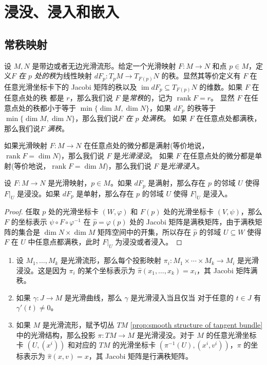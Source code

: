 \documentclass[fontset=none]{Notes}
\DeclareMathOperator\im{im}
\DeclareMathOperator\rk{rank}
\begin{document}
\chapter{浸没、浸入和嵌入}

\section{常秩映射}

设 $M,N$ 是带边或者无边光滑流形。给定一个光滑映射 $F:M\to N$
和点 $p\in M$，定义\emph{$F$ 在 $p$ 处的秩}为线性映射 $dF_p:T_pM\to T_{F(p)}N$
的秩。显然其等价定义有 $F$ 在任意光滑坐标卡下的 Jacobi 矩阵的秩以及
$\im dF_p\subseteq T_{F(p)}N$ 的维数。如果 $F$ 在任意点处的秩
都是 $r$，那么我们说 $F$ 是\emph{常秩}的，记为 $\rk F=r$。
显然 $F$ 在任意点处的秩都小于等于 $\min\{\dim M,\dim N\}$，如果
$dF_p$ 的秩等于 $\min\{\dim M,\dim N\}$，那么我们说\emph{$F$ 在 $p$ 处满秩}。
如果 $F$ 在任意点处都满秩，那么我们说\emph{$F$ 满秩}。

如果光滑映射 $F:M\to N$ 在任意点处的微分都是满射(等价地说，$\rk F=\dim N$)，那么我们说 $F$ 是\emph{光滑浸没}。
如果 $F$ 在任意点处的微分都是单射(等价地说，$\rk F=\dim M$)，那么我们说 $F$ 是\emph{光滑浸入}。

\begin{proposition}\label{prop:regular points is open}
  设 $F:M\to N$ 是光滑映射，$p\in M$。如果 $dF_p$ 是满射，那么存在 $p$ 
  的邻域 $U$ 使得 $F|_U$ 是浸没。如果 $dF_p$ 是单射，那么存在 $p$ 
  的邻域 $U$ 使得 $F|_U$ 是浸入。
\end{proposition}
\begin{proof}
  任取 $p$ 处的光滑坐标卡 $(W,\varphi)$ 和 $F(p)$ 处的光滑坐标卡 $(V,\psi)$，那么 $F$
  的坐标表示 $\psi\circ F\circ\varphi^{-1}$ 在 $\hat p=\varphi(p)$ 处的 Jacobi 矩阵是满秩矩阵，由于满秩矩阵的集合是 $\dim N\times\dim M$
  矩阵空间中的开集，所以存在 $\hat p$ 的邻域 $U\subseteq W$ 使得 $F$ 
  在 $U$ 中任意点都满秩，此时 $F|_U$ 为浸没或者浸入。
\end{proof}

\begin{example}[浸没和浸入]
  \mbox{}
  \begin{enumerate}
    \item 设 $M_1,\dots,M_k$ 是光滑流形，那么每个投影映射 $\pi_i:M_1\times\cdots\times M_k\to M_i$
    是光滑浸没。这是因为 $\pi_i$ 的某个坐标表示为
    $\hat \pi(x_1,\dots,x_k)=x_i$，其 Jacobi 矩阵满秩。
    \item 如果 $\gamma:J\to M$ 是光滑曲线，那么 $\gamma$ 是光滑浸入当且仅当
    对于任意的 $t\in J$ 有 $\gamma'(t)\neq 0$。
    \item 如果 $M$ 是光滑流形，赋予切丛 $TM$ \autoref{prop:smooth structure of tangent bundle}
    中的光滑结构，那么投影 $\pi:TM\to M$ 是光滑浸没。对于 $M$ 的任意光滑坐标卡
    $(U,(x^i))$ 和对应的 $TM$ 的光滑坐标卡 $(\pi^{-1}(U),(x^i,v^i))$，$\pi$
    的坐标表示为 $\hat \pi(x,v)=x$，其 Jacobi 矩阵是行满秩矩阵。
  \end{enumerate}
\end{example}
\end{document}
